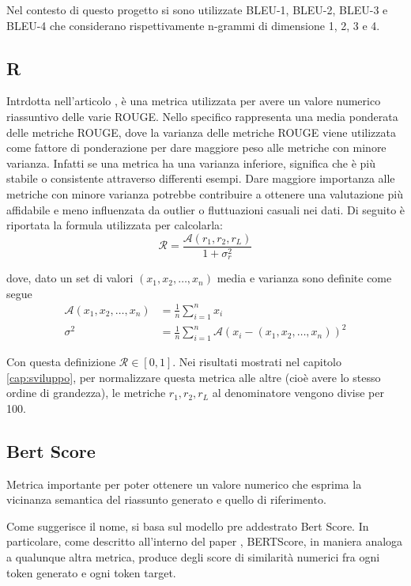 \documentclass[12pt,a4paper,twoside,openright]{book}
\begin{document}
Nel contesto di questo progetto si sono utilizzate BLEU-1, BLEU-2, BLEU-3 e BLEU-4 che considerano rispettivamente n-grammi di dimensione 1, 2, 3 e 4.


\subsection{R}

Intrdotta nell'articolo \cite{DBLP:conf/aaai/MoroRV23}, è una metrica utilizzata per avere un valore numerico riassuntivo delle varie ROUGE. Nello specifico rappresenta una media ponderata delle metriche ROUGE, dove la varianza delle metriche ROUGE viene utilizzata come fattore di ponderazione per dare maggiore peso alle metriche con minore varianza. Infatti se una metrica ha una varianza inferiore, significa che è più stabile o consistente attraverso differenti esempi. Dare maggiore importanza alle metriche con minore varianza potrebbe contribuire a ottenere una valutazione più affidabile e meno influenzata da outlier o fluttuazioni casuali nei dati.
Di seguito è riportata la formula utilizzata per calcolarla:
\begin{equation*}
    \mathcal{R} = \frac{\mathcal{A}(r_1, r_2, r_L)}{1+\sigma_r^2}
\end{equation*}

dove, dato un set di valori $(x_1, x_2, \dots, x_n)$ media e varianza sono definite come segue
\begin{align*}
    \mathcal{A}(x_1, x_2, \dots, x_n) &= \frac{1}{n} \sum_{i=1}^n x_i \\
    \sigma^2 &= \frac{1}{n} \sum_{i=1}^n \mathcal{A}(x_i - (x_1, x_2, \dots, x_n))^2
\end{align*}

Con questa definizione $\mathcal{R} \in [0,1]$. Nei risultati mostrati nel capitolo \ref{cap:sviluppo}, per normalizzare questa metrica alle altre (cioè avere lo stesso ordine di grandezza), le metriche $r_1,r_2,r_L$ al denominatore vengono divise per 100.

\subsection{Bert Score}
Metrica importante per poter ottenere un valore numerico che esprima la vicinanza semantica del riassunto generato e quello di riferimento. 

Come suggerisce il nome, si basa sul modello pre addestrato Bert Score. In particolare, come descritto all'interno del paper \cite{zhang2020bertscore}, BERTScore, in maniera analoga a qualunque altra metrica, produce degli score di similarità numerici fra ogni token generato e ogni token target. 
\end{document}
